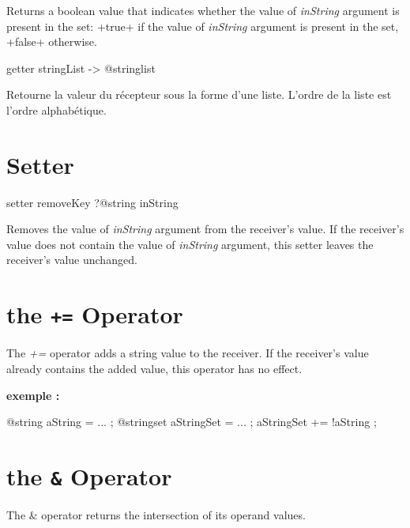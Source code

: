 Returns a boolean value that indicates whether the value of \emph{inString} argument is present in the set: \ggst+true+ if the value of \emph{inString} argument is present in the set, \ggst+false+ otherwise.





\begin{galgas3}
getter stringList -> @stringlist
\end{galgas3}

Retourne la valeur du récepteur sous la forme d'une liste. L'ordre de la liste est l'ordre alphabétique.



\section{Setter}


\begin{galgas3}
setter removeKey ?@string inString
\end{galgas3}


Removes the value of \emph{inString} argument from the receiver's value. If the receiver's value does not contain the value of \emph{inString} argument, this setter leaves the receiver's value unchanged.






\section{the \texttt{+=} Operator}

The \emph{+=} operator adds a string value to the receiver. If the receiver's value already contains the added value, this operator has no effect.

\textbf{exemple :}
\begin{galgas3}
@string aString = ... ;
@stringset aStringSet = ... ;
aStringSet += !aString ;
\end{galgas3}




\section{the \texttt{\&} Operator}

The \emph{$\&$} operator returns the intersection of its operand values.

